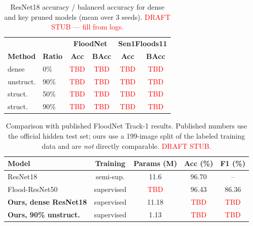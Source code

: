 \documentclass[conference]{IEEEtran}
\newcommand{\TBD}{\textcolor{red}{TBD}}
\newif\ifreview
\newcommand{\REV}[1]{\ifreview\textcolor{red}{\textbf{[Revise: #1]}}\fi}
\begin{document}
\begin{table}[t]
\centering
\caption{ResNet18 accuracy / balanced accuracy for dense and key
pruned models (mean over 3 seeds). \textcolor{red}{DRAFT STUB --- fill from logs.}}
\label{tab:acc}
\footnotesize
\setlength{\tabcolsep}{3.4pt}
\begin{tabular}{llcccc}
\toprule
& & \multicolumn{2}{c}{\textbf{FloodNet}} & \multicolumn{2}{c}{\textbf{Sen1Floods11}}\\
\cmidrule(lr){3-4}\cmidrule(lr){5-6}
\textbf{Method} & \textbf{Ratio} & \textbf{Acc} & \textbf{BAcc} & \textbf{Acc} & \textbf{BAcc}\\
\midrule
dense      & 0\%  & \TBD & \TBD & \TBD & \TBD\\
unstruct.  & 90\% & \TBD & \TBD & \TBD & \TBD\\
struct.    & 50\% & \TBD & \TBD & \TBD & \TBD\\
struct.    & 90\% & \TBD & \TBD & \TBD & \TBD\\
\bottomrule
\end{tabular}
\end{table}

\begin{table}[t]
\centering
\caption{Comparison with published FloodNet Track-1 results. Published
numbers use the official hidden test set; ours use a 199-image split of
the labeled training data and are \emph{not} directly comparable.
\textcolor{red}{DRAFT STUB.}}
\label{tab:compare}
\footnotesize
\setlength{\tabcolsep}{3pt}
\begin{tabular}{lcccc}
\toprule
\textbf{Model} & \textbf{Training} & \textbf{Params (M)} & \textbf{Acc (\%)} & \textbf{F1 (\%)}\\
\midrule
ResNet18 \cite{khose2021semisupervised} & semi-sup. & 11.6 & 96.70 & --\\
Flood-ResNet50 \cite{khan2023floodresnet50} & supervised & \TBD & 96.43 & 86.36\\
\textbf{Ours, dense ResNet18} & supervised & 11.18 & \TBD & \TBD\\
\textbf{Ours, 90\% unstruct.} & supervised & 1.13 & \TBD & \TBD\\
\bottomrule
\end{tabular}
\end{table}
\REV{[A7] Optional but valuable; drop this table if space is short and
put one sentence in the text instead. Fill Flood-ResNet50 params from
the original paper. F1 definitions differ (macro vs.\ class-specific):
state which.}
\end{document}
